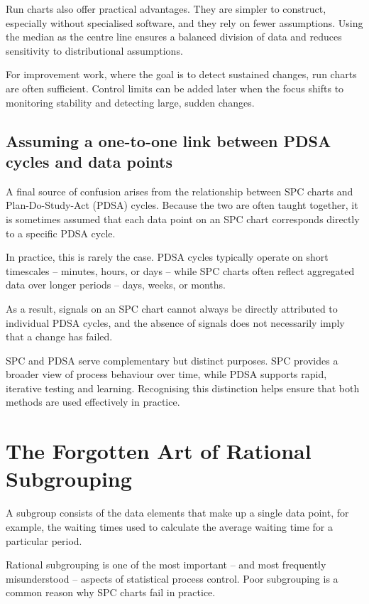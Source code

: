 \documentclass[
]{book}
\begin{document}
Run charts also offer practical advantages. They are simpler to
construct, especially without specialised software, and they rely on
fewer assumptions. Using the median as the centre line ensures a
balanced division of data and reduces sensitivity to distributional
assumptions.

For improvement work, where the goal is to detect sustained changes, run
charts are often sufficient. Control limits can be added later when the
focus shifts to monitoring stability and detecting large, sudden
changes.

\section{Assuming a one-to-one link between PDSA cycles and data
points}\label{assuming-a-one-to-one-link-between-pdsa-cycles-and-data-points}

A final source of confusion arises from the relationship between SPC
charts and Plan-Do-Study-Act (PDSA) cycles. Because the two are often
taught together, it is sometimes assumed that each data point on an SPC
chart corresponds directly to a specific PDSA cycle.

In practice, this is rarely the case. PDSA cycles typically operate on
short timescales -- minutes, hours, or days -- while SPC charts often
reflect aggregated data over longer periods -- days, weeks, or months.

As a result, signals on an SPC chart cannot always be directly
attributed to individual PDSA cycles, and the absence of signals does
not necessarily imply that a change has failed.

SPC and PDSA serve complementary but distinct purposes. SPC provides a
broader view of process behaviour over time, while PDSA supports rapid,
iterative testing and learning. Recognising this distinction helps
ensure that both methods are used effectively in practice.

\chapter{The Forgotten Art of Rational Subgrouping}\label{subgrouping}

A subgroup consists of the data elements that make up a single data
point, for example, the waiting times used to calculate the average
waiting time for a particular period.

Rational subgrouping is one of the most important -- and most frequently
misunderstood -- aspects of statistical process control. Poor
subgrouping is a common reason why SPC charts fail in practice.
\end{document}
